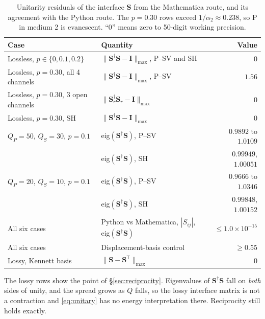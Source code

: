 \documentclass[11pt,a4paper]{article}
\newcommand{\bI}{\mathbf{I}}
\newcommand{\bS}{\mathbf{S}}
\newcommand{\herm}{^{\dagger}}
\begin{document}
\begin{table}[h]
\centering
\caption{Unitarity residuals of the interface $\bS$ from the
Mathematica route, and its agreement with the Python route. The
$p = 0.30$ rows exceed $1/\alpha_2 \approx 0.238$, so P in medium 2 is
evanescent. ``0'' means zero to 50-digit working precision.}
\label{tab:numerics}
\small
\begin{tabular}{l l r}
\toprule
Case & Quantity & Value \\
\midrule
Lossless, $p \in \{0, 0.1, 0.2\}$ & $\lVert\bS\herm\bS - \bI\rVert_{\max}$, P--SV and SH & $0$ \\
Lossless, $p = 0.30$, all 4 channels & $\lVert\bS\herm\bS - \bI\rVert_{\max}$, P--SV & $1.56$ \\
Lossless, $p = 0.30$, 3 open channels & $\lVert\bS_r\herm\bS_r - \bI\rVert_{\max}$ & $0$ \\
Lossless, $p = 0.30$, SH & $\lVert\bS\herm\bS - \bI\rVert_{\max}$ & $0$ \\
$Q_P = 50$, $Q_S = 30$, $p = 0.1$ & eig$(\bS\herm\bS)$, P--SV & $0.9892$ to $1.0109$ \\
 & eig$(\bS\herm\bS)$, SH & $0.99949$, $1.00051$ \\
$Q_P = 20$, $Q_S = 10$, $p = 0.1$ & eig$(\bS\herm\bS)$, P--SV & $0.9666$ to $1.0346$ \\
 & eig$(\bS\herm\bS)$, SH & $0.99848$, $1.00152$ \\
\midrule
All six cases & Python vs Mathematica, $|S_{ij}|$, eig$(\bS\herm\bS)$ & $\le 1.0\times10^{-15}$ \\
All six cases & Displacement-basis control & $\ge 0.55$ \\
Lossy, Kennett basis & $\lVert\bS - \bS^{\mathsf T}\rVert_{\max}$ & $0$ \\
\bottomrule
\end{tabular}
\end{table}

The lossy rows show the point of \S\ref{sec:reciprocity}. Eigenvalues
of $\bS\herm\bS$ fall on \emph{both} sides of unity, and the spread
grows as $Q$ falls, so the lossy interface matrix is not a contraction
and \eqref{eq:unitary} has no energy interpretation there. Reciprocity
still holds exactly.


\end{document}
